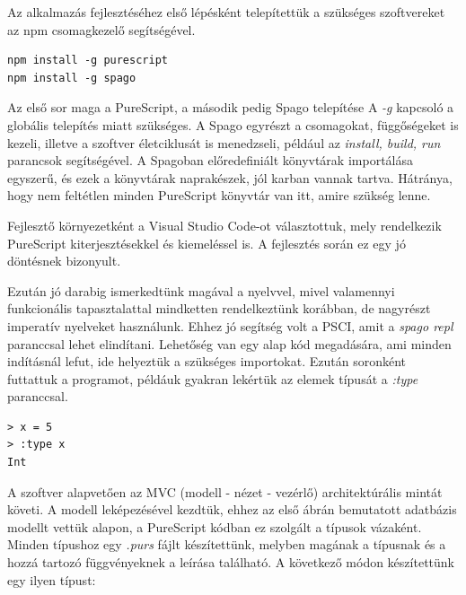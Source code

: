 \documentclass[12pt]{article}
\begin{document}
Az alkalmazás fejlesztéséhez első lépésként telepítettük a szükséges szoftvereket az npm csomagkezelő segítségével. 
\begin{verbatim}
npm install -g purescript
npm install -g spago
\end{verbatim}

Az első sor maga a PureScript, a második pedig Spago telepítése A \textit{-g} kapcsoló a globális telepítés miatt szükséges. A Spago egyrészt a csomagokat, függőségeket is kezeli, illetve a szoftver életciklusát is menedzseli, például az \textit{install, build, run} parancsok segítségével.  A Spagoban előredefiniált könyvtárak importálása egyszerű, és ezek a könyvtárak naprakészek,  jól karban vannak tartva. Hátránya, hogy nem feltétlen minden PureScript könyvtár van itt, amire szükség lenne. 

Fejlesztő környezetként a Visual Studio Code-ot választottuk, mely rendelkezik PureScript kiterjesztésekkel és kiemeléssel is. A fejlesztés során ez egy jó döntésnek bizonyult.

Ezután jó darabig ismerkedtünk magával a nyelvvel, mivel valamennyi funkcionális tapasztalattal mindketten rendelkeztünk korábban, de nagyrészt imperatív nyelveket használunk.  Ehhez jó segítség volt a PSCI, amit a \textit{spago repl} paranccsal lehet elindítani. Lehetőség van egy alap kód megadására, ami minden indításnál lefut, ide helyeztük a szükséges importokat. Ezután soronként futtattuk a programot, példáuk gyakran lekértük az elemek típusát a \textit{:type} paranccsal.

\begin{verbatim}
> x = 5
> :type x
Int
\end{verbatim}

A szoftver alapvetően az MVC (modell - nézet - vezérlő) architektúrális mintát követi.  A modell leképezésével kezdtük, ehhez az első ábrán bemutatott adatbázis modellt vettük alapon, a PureScript kódban ez szolgált a típusok vázaként. Minden típushoz egy \textit{.purs} fájlt készítettünk, melyben magának a típusnak és a hozzá tartozó függvényeknek a leírása található. A következő módon készítettünk egy ilyen típust:
\end{document}
